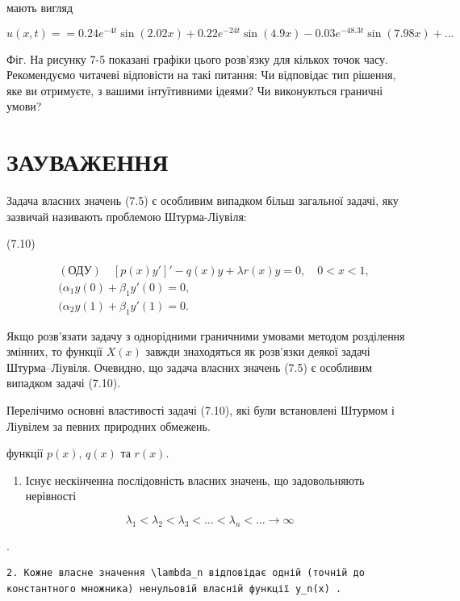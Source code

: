\documentclass[
  ukrainian,
]{article}
\providecommand{\tightlist}{%
  \setlength{\itemsep}{0pt}\setlength{\parskip}{0pt}}
\begin{document}
мають вигляд

\[
u(x, t) = = 0.24e^{-4t} \sin(2.02x) + 0.22e^{-24t} \sin(4.9x) - 0.03e^{-48.3t} \sin(7.98x) + \dots
\]

Фіг. На рисунку 7-5 показані графіки цього розв'язку для кількох точок
часу. Рекомендуємо читачеві відповісти на такі питання: Чи відповідає
тип рішення, яке ви отримуєте, з вашими інтуїтивними ідеями? Чи
виконуються граничні умови?

\section{ЗАУВАЖЕННЯ}\label{ux437ux430ux443ux432ux430ux436ux435ux43dux43dux44f}

Задача власних значень (7.5) є особливим випадком більш загальної
задачі, яку зазвичай називають проблемою Штурма-Ліувіля:

(7.10)

\[
\begin{aligned} & (\text{ОДУ}) \quad [p(x)y']' - q(x)y + \lambda r(x)y = 0, \quad 0 < x < 1, \\ & (\alpha_1 y(0) + \beta_1 y'(0) = 0, \\ & (\alpha_2 y(1) + \beta_1 y'(1) = 0. \end{aligned}
\]

Якщо розв'язати задачу з однорідними граничними умовами методом
розділення змінних, то функції \(X(x)\) завжди знаходяться як розв'язки
деякої задачі Штурма--Ліувіля. Очевидно, що задача власних значень (7.5)
є особливим випадком задачі (7.10).

Перелічимо основні властивості задачі (7.10), які були встановлені
Штурмом і Ліувілем за певних природних обмежень.

функції \(p(x)\), \(q(x)\) та \(r(x)\).

\begin{enumerate}
\def\labelenumi{\arabic{enumi}.}
\tightlist
\item
  Існує нескінченна послідовність власних значень, що задовольняють
  нерівності
\end{enumerate}

\[
\lambda_1 < \lambda_2 < \lambda_3 < \ldots < \lambda_n < \ldots \to \infty
\]

.

\begin{verbatim}
2. Кожне власне значення \lambda_n відповідає одній (точній до константного множника) ненульовій власній функції y_n(x) .
\end{verbatim}
\end{document}
